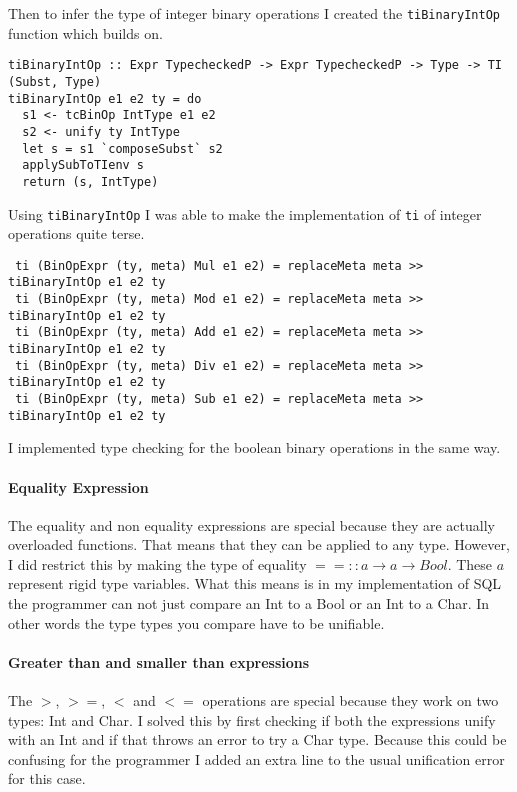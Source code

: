 \documentclass{report}
\begin{document}
\noindent Then to infer the type of integer binary operations I created the \texttt{tiBinaryIntOp} function which builds on.

\begin{verbatim}
tiBinaryIntOp :: Expr TypecheckedP -> Expr TypecheckedP -> Type -> TI (Subst, Type)
tiBinaryIntOp e1 e2 ty = do
  s1 <- tcBinOp IntType e1 e2
  s2 <- unify ty IntType
  let s = s1 `composeSubst` s2
  applySubToTIenv s 
  return (s, IntType)
\end{verbatim}

\noindent Using \texttt{tiBinaryIntOp} I was able to make the implementation of \texttt{ti} of integer operations quite terse. 

\begin{verbatim}
 ti (BinOpExpr (ty, meta) Mul e1 e2) = replaceMeta meta >> tiBinaryIntOp e1 e2 ty
 ti (BinOpExpr (ty, meta) Mod e1 e2) = replaceMeta meta >> tiBinaryIntOp e1 e2 ty
 ti (BinOpExpr (ty, meta) Add e1 e2) = replaceMeta meta >> tiBinaryIntOp e1 e2 ty
 ti (BinOpExpr (ty, meta) Div e1 e2) = replaceMeta meta >> tiBinaryIntOp e1 e2 ty
 ti (BinOpExpr (ty, meta) Sub e1 e2) = replaceMeta meta >> tiBinaryIntOp e1 e2 ty
\end{verbatim}

\noindent I implemented type checking for the boolean binary operations in the same way.

\paragraph{Equality Expression} The equality and non equality expressions are special because they are actually overloaded functions. That means that they can be applied to any type. However, I did restrict this by making the type of equality $== :: a \rightarrow a \rightarrow Bool$. These $a$ represent rigid type variables. What this means is in my implementation of SQL the programmer can not just compare an Int to a Bool or an Int to a Char. In other words the type types you compare have to be unifiable.  

\paragraph{Greater than and smaller than expressions} The $>$, $>=$, $<$ and $<=$ operations are special because they work on two types: Int and Char. I solved this by first checking if both the expressions unify with an Int and if that throws an error to try a Char type. Because this could be confusing for the programmer I added an extra line to the usual unification error for this case. 
\end{document}
